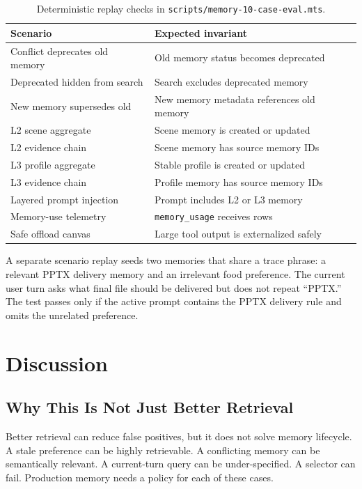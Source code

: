 \documentclass[11pt]{article}
\begin{document}
\begin{table}[h]
\centering
\small
\begin{tabular}{ll}
\toprule
Scenario & Expected invariant \\
\midrule
Conflict deprecates old memory & Old memory status becomes deprecated \\
Deprecated hidden from search & Search excludes deprecated memory \\
New memory supersedes old & New memory metadata references old memory \\
L2 scene aggregate & Scene memory is created or updated \\
L2 evidence chain & Scene memory has source memory IDs \\
L3 profile aggregate & Stable profile is created or updated \\
L3 evidence chain & Profile memory has source memory IDs \\
Layered prompt injection & Prompt includes L2 or L3 memory \\
Memory-use telemetry & \texttt{memory\_usage} receives rows \\
Safe offload canvas & Large tool output is externalized safely \\
\bottomrule
\end{tabular}
\caption{Deterministic replay checks in \texttt{scripts/memory-10-case-eval.mts}.}
\label{tab:replay}
\end{table}

A separate scenario replay seeds two memories that share a trace phrase: a
relevant PPTX delivery memory and an irrelevant food preference. The current user
turn asks what final file should be delivered but does not repeat ``PPTX.'' The
test passes only if the active prompt contains the PPTX delivery rule and omits
the unrelated preference.

\section{Discussion}

\subsection{Why This Is Not Just Better Retrieval}

Better retrieval can reduce false positives, but it does not solve memory
lifecycle. A stale preference can be highly retrievable. A conflicting memory can
be semantically relevant. A current-turn query can be under-specified. A selector
can fail. Production memory needs a policy for each of these cases.
\end{document}
